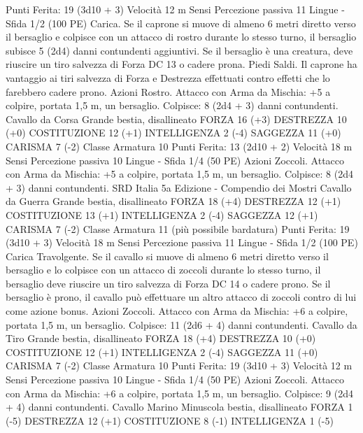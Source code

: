 \begin{multicols}{2}
\hspace*{0pt}\hfill{Punti Ferita}: 19 (3d10 + 3)
Velocità 12 m
Sensi Percezione passiva 11
Lingue -
Sfida 1/2 (100 PE)
Carica. Se il caprone si muove di almeno 6 metri diretto verso il
bersaglio e colpisce con un attacco di rostro durante lo stesso
turno, il bersaglio subisce 5 (2d4) danni contundenti aggiuntivi.
Se il bersaglio è una creatura, deve riuscire un tiro salvezza di
Forza DC 13 o cadere prona.
Piedi Saldi. Il caprone ha vantaggio ai tiri salvezza di Forza e
Destrezza effettuati contro effetti che lo farebbero cadere prono.
Azioni
Rostro. Attacco con Arma da Mischia: +5 a colpire, portata 1,5
m, un bersaglio.
Colpisce: 8 (2d4 + 3) danni contundenti.
Cavallo da Corsa
Grande bestia, disallineato
FORZA 16 (+3)
DESTREZZA 10 (+0)
COSTITUZIONE 12 (+1)
INTELLIGENZA 2 (-4)
SAGGEZZA 11 (+0)
CARISMA 7 (-2)
Classe Armatura 10
\hspace*{0pt}\hfill{Punti Ferita}: 13 (2d10 + 2)
Velocità 18 m
Sensi Percezione passiva 10
Lingue -
Sfida 1/4 (50 PE)
Azioni
Zoccoli. Attacco con Arma da Mischia: +5 a colpire, portata 1,5
m, un bersaglio.
Colpisce: 8 (2d4 + 3) danni contundenti. 
SRD Italia 5a Edizione - Compendio dei Mostri
Cavallo da Guerra
Grande bestia, disallineato
FORZA 18 (+4)
DESTREZZA 12 (+1)
COSTITUZIONE 13 (+1)
INTELLIGENZA 2 (-4)
SAGGEZZA 12 (+1)
CARISMA 7 (-2)
Classe Armatura 11 (più possibile bardatura)
\hspace*{0pt}\hfill{Punti Ferita}: 19 (3d10 + 3)
Velocità 18 m
Sensi Percezione passiva 11
Lingue -
Sfida 1/2 (100 PE)
Carica Travolgente. Se il cavallo si muove di almeno 6 metri diretto
verso il bersaglio e lo colpisce con un attacco di zoccoli durante lo
stesso turno, il bersaglio deve riuscire un tiro salvezza di Forza DC
14 o cadere prono. Se il bersaglio è prono, il cavallo può effettuare
un altro attacco di zoccoli contro di lui come azione bonus.
Azioni
Zoccoli. Attacco con Arma da Mischia: +6 a colpire, portata 1,5
m, un bersaglio.
Colpisce: 11 (2d6 + 4) danni contundenti.
Cavallo da Tiro
Grande bestia, disallineato
FORZA 18 (+4)
DESTREZZA 10 (+0)
COSTITUZIONE 12 (+1)
INTELLIGENZA 2 (-4)
SAGGEZZA 11 (+0)
CARISMA 7 (-2)
Classe Armatura 10
\hspace*{0pt}\hfill{Punti Ferita}: 19 (3d10 + 3)
Velocità 12 m
Sensi Percezione passiva 10
Lingue -
Sfida 1/4 (50 PE)
Azioni
Zoccoli. Attacco con Arma da Mischia: +6 a colpire, portata 1,5
m, un bersaglio.
Colpisce: 9 (2d4 + 4) danni contundenti.
Cavallo Marino
Minuscola bestia, disallineato
FORZA 1 (-5)
DESTREZZA 12 (+1)
COSTITUZIONE 8 (-1)
INTELLIGENZA 1 (-5)

\end{multicols}
